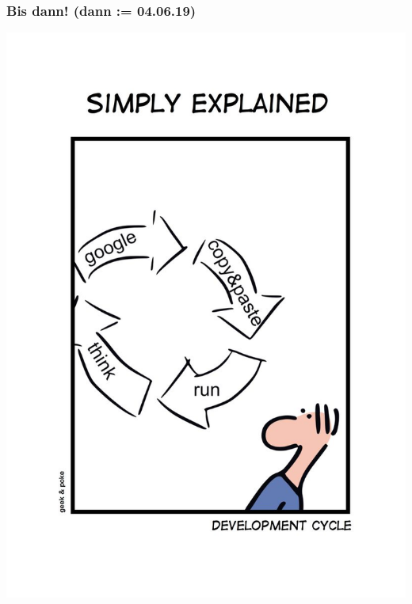 \documentclass[18pt]{beamer}
\begin{document}
	\begin{frame}
		\frametitle{Bis dann! (dann := 04.06.19)}
		\centering
		\includegraphics[scale=0.9]{./comics/geek_and_poke_development.jpg}
	\end{frame}
\end{document}
